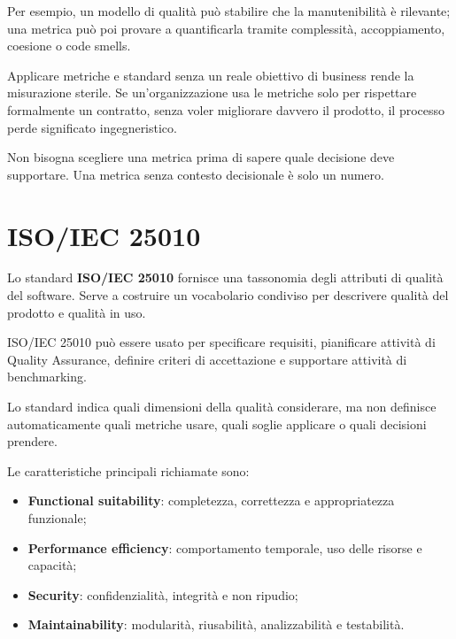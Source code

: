 Per esempio, un modello di qualità può stabilire che la manutenibilità è rilevante; una metrica può poi provare a quantificarla tramite complessità, accoppiamento, coesione o code smells.

\begin{notaprof}
Applicare metriche e standard senza un reale obiettivo di business rende la misurazione sterile. Se un'organizzazione usa le metriche solo per rispettare formalmente un contratto, senza voler migliorare davvero il prodotto, il processo perde significato ingegneristico.
\end{notaprof}

\begin{notaesame}
Non bisogna scegliere una metrica prima di sapere quale decisione deve supportare. Una metrica senza contesto decisionale è solo un numero.
\end{notaesame}

\section{ISO/IEC 25010}

Lo standard \textbf{ISO/IEC 25010} fornisce una tassonomia degli attributi di qualità del software. Serve a costruire un vocabolario condiviso per descrivere qualità del prodotto e qualità in uso.

\begin{notaslide}
ISO/IEC 25010 può essere usato per specificare requisiti, pianificare attività di Quality Assurance, definire criteri di accettazione e supportare attività di benchmarking.
\end{notaslide}

Lo standard indica quali dimensioni della qualità considerare, ma non definisce automaticamente quali metriche usare, quali soglie applicare o quali decisioni prendere.

Le caratteristiche principali richiamate sono:

\begin{itemize}
    \item \textbf{Functional suitability}: completezza, correttezza e appropriatezza funzionale;
    \item \textbf{Performance efficiency}: comportamento temporale, uso delle risorse e capacità;
    \item \textbf{Security}: confidenzialità, integrità e non ripudio;
    \item \textbf{Maintainability}: modularità, riusabilità, analizzabilità e testabilità.
\end{itemize}

